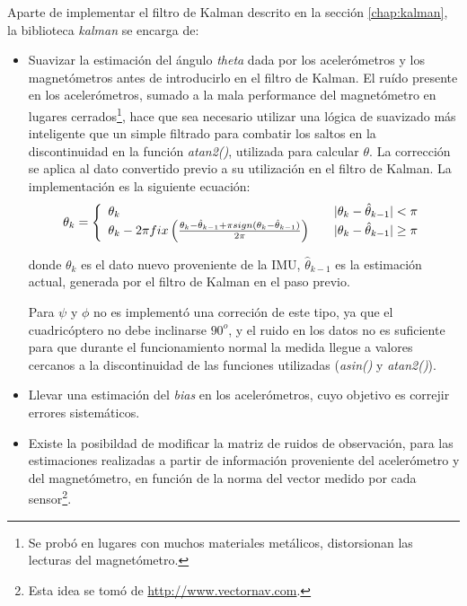 \documentclass[main]{subfiles}
\begin{document}
Aparte de implementar el filtro de Kalman descrito en la secci\'on \ref{chap:kalman}, la biblioteca \textit{kalman} se encarga de:


\begin{itemize}
\item Suavizar la estimaci\'on del \'angulo \textit{theta} dada por los aceler\'ometros y los magnet\'ometros antes de introducirlo en el filtro de Kalman. El ru\'ido presente en los aceler\'ometros, sumado a la mala performance del magnet\'ometro en lugares cerrados\footnote{Se prob\'o en lugares con muchos materiales met\'alicos, distorsionan las lecturas del magnet\'ometro.}, hace que sea necesario utilizar una l\'ogica de suavizado m\'as inteligente que un simple filtrado para combatir los saltos en la discontinuidad en la funci\'on \textit{atan2()}, utilizada para calcular $\theta$. La correcci\'on se aplica al dato convertido previo a su utilizaci\'on en el filtro de Kalman. La implementaci\'on es la siguiente ecuaci\'on:
  \[
  \theta_k = \left\{
  \begin{array}{l l}
    \theta_k & \quad \vert \theta_k - \hat{\theta}_{k-1} \vert < \pi \\
    \theta_k - 2\pi fix\left(\frac{\theta_k - \hat{\theta}_{k-1} + \pi sign(\theta_k - \hat{\theta}_{k-1})}{2\pi}\right) & \quad  \vert \theta_k - \hat{\theta}_{k-1} \vert \geq \pi \\
  \end{array} \right.
\]

donde $\theta_k$ es el dato nuevo proveniente de la IMU, $\hat{\theta}_{k-1}$ es la estimaci\'on actual, generada por el filtro de Kalman en el paso previo.

Para $\psi$ y $\phi$ no es implement\'o una correci\'on de este tipo, ya que el cuadric\'optero no debe inclinarse $90^o$, y el ruido en los datos no es suficiente para que durante el funcionamiento normal la medida llegue a valores cercanos a la discontinuidad de las funciones utilizadas (\textit{asin()} y \textit{atan2()}).

\item Llevar una estimaci\'on del \textit{bias} en los aceler\'ometros, cuyo objetivo es correjir errores sistem\'aticos.
\item Existe la posibildad de modificar la matriz de ruidos de observaci\'on, para las estimaciones realizadas a partir de informaci\'on proveniente del aceler\'ometro y del magnet\'ometro, en funci\'on de la norma del vector medido por cada sensor\footnote{Esta idea se tom\'o de \url{http://www.vectornav.com}.}.
\end{itemize}
\end{document}
